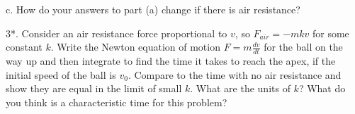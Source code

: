 \documentclass[12pt]{article}
\begin{document}
\bigskip
\bigskip
\bigskip
\bigskip
\bigskip
\bigskip
\bigskip
\bigskip



c. How do your answers to part (a) change if there is air resistance?

\bigskip
\bigskip
\bigskip
\bigskip
\bigskip
\bigskip
\bigskip



3*.  Consider an air resistance force proportional to $v$, so $F_{air}=-mkv$ for some constant $k$. Write the Newton equation of motion $F=m\frac{dv}{dt}$ for the ball on the way up and then integrate to find the time it takes to reach the apex, if the initial speed of the ball is $v_0$. Compare to the time with no air resistance and show they are equal in the limit of small $k$. What are the units of $k$? What do you think is a characteristic time for this problem?
\end{document}
